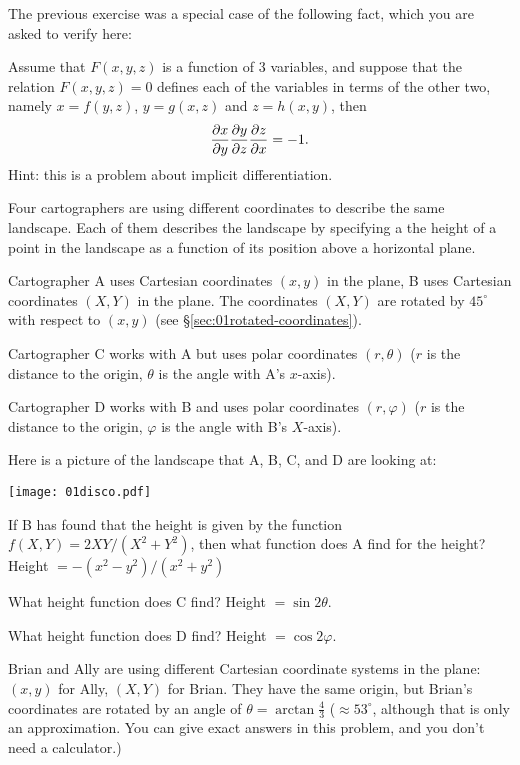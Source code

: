 \begin{multicols}{2}
\problem The previous exercise was a special case of the following 
fact, which you are asked to verify here:

Assume that $F(x,y,z)$ is a function of 3 variables, and suppose that
the relation $F(x,y,z)=0$ defines each of the variables in terms of
the other two, namely $x=f(y,z)$, $y=g(x,z)$ and $z=h(x,y)$, then
\[
\frac{\partial x}{\partial y} \frac{\partial y}{\partial z} \frac{\partial z}{\partial x} =-1.
\]
Hint: this is a problem about implicit differentiation.


\problem
Four cartographers are using different coordinates to describe the
same landscape.  Each of them describes the landscape by specifying a
the height of a point in the landscape as a function of its position
above a horizontal plane.

Cartographer A uses Cartesian coordinates $(x, y)$ in the plane, B
uses Cartesian coordinates $(X,Y)$ in the plane.
The coordinates $(X,Y)$ are rotated by $45^\circ$ with respect to 
$(x, y)$ (see \S\ref{sec:01rotated-coordinates}).  

Cartographer C works with A but uses polar coordinates $(r, \theta)$
($r$ is the distance to the origin, $\theta$ is the angle with A's
$x$-axis).  

Cartographer D works with B and uses polar coordinates $(r, \varphi)$ 
($r$ is the distance to the origin, $\varphi$ is the angle with B's
$X$-axis).  

Here is a picture of the landscape that A, B, C, and D are
looking at:

\begin{center}
  \texttt{[image: 01disco.pdf]}
\end{center}

\subprob If B has found that the height is given by the function 
$f(X, Y) = 2XY/(X^2+Y^2)$, then what function does A find for the
height?
\answer
Height $ = - (x^2-y^2)/(x^2+y^2)$
\endanswer

\subprob What height function does C find?
\answer
Height $ = \sin 2\theta$.
\endanswer

\subprob What height function does D find?
\answer
Height $ = \cos 2\varphi$.
\endanswer

\problem Brian and Ally are using different Cartesian coordinate 
systems in the plane: $(x, y)$ for Ally, $(X,Y)$ for Brian.  They have
the same origin, but Brian's coordinates are rotated by an angle of
$\theta = \arctan \frac43$ ($\approx 53^\circ$, although that is only an
approximation.  You can give exact answers in this problem, and you
don't need a calculator.)


\end{multicols}
